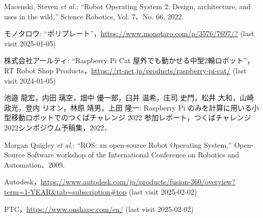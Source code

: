\documentclass[twocolumn,9pt]{jsproceedings}
\begin{document}
\footnotesize
\begin{thebibliography}{99}

  Macenski, Steven {\it et al.}: ``Robot Operating System 2: Design, architecture, and uses in the wild,''
  Science Robotics, Vol. 7、No. 66, 2022.



  モノタロウ: ``ポリプレート''，\url{https://www.monotaro.com/p/3576/7697/?} (last visit 2025-01-05)

  株式会社アールティ: ``Raspberry Pi Cat 屋外でも動かせる中型2輪ロボット''，
  RT Robot Shop Products，\url{https://rt-net.jp/products/raspberry-pi-cat/} (last visit 2024-01-05)

  池邉 龍宏，内田 璃空，畑中 優一郎，臼井 温希，庄司 史門，松井 大和，山崎 政光，登内 リオン，林原 靖男，上田 隆一: Raspberry Pi のみを計算に用いる小型移動ロボットでのつくばチャレンジ 2022 参加レポート，つくばチャレンジ2022シンポジウム予稿集，2022．

  Morgan Quigley {\it et al.}: ``ROS: an open-source Robot Operating System,''
  Open-Source Software workshop of the International Conference on Robotics and Automation、2009.

  Autodesk，\url{https://www.autodesk.com/jp/products/fusion-360/overview?term=1-YEAR&tab=subscription#top} (last visit 2025-02-02)

  PTC，\url{https://www.onshape.com/en/} (last visit 2025-02-02)





\end{thebibliography}
\end{document}
